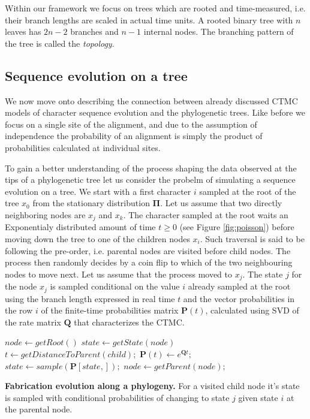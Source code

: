 \documentclass[12pt,twoside]{mitthesis}
\theoremstyle{plain}
\theoremstyle{definition}
\theoremstyle{remark}
\begin{document}
Within our framework we focus on trees which are rooted and time-measured, i.e. their branch lengths are scaled in actual time units.
A rooted binary tree with $n$ leaves has $2n-2$ branches and $n-1$ internal nodes.
The branching pattern of the tree is called the \emph{topology}. 

\subsection{Sequence evolution on a tree\label{sub:evolutionOnTree}}

We now move onto describing the connection between already discussed CTMC models of character sequence evolution and the phylogenetic trees.
Like before we focus on a single site of the alignment, and due to the assumption of independence the probability of an alignment is simply the product of probabilities calculated at individual sites.

To gain a better understanding of the process shaping the data observed at the tips of a phylogenetic tree let us consider the probelm of simulating a sequence evolution on a tree.
We start with a first character $i$ sampled at the root of the tree $x_0$ from the stationary distribution $\mathbf{\Pi}$.
Let us assume that two directly neighboring nodes are $x_j$ and $x_k$.
The character sampled at the root waits an Exponentialy distributed amount of time $t\geq0$ (see Figure \ref{fig:poisson}) before moving down the tree to one of the children nodes $x_i$.
Such traversal is said to be following the pre-order, i.e. parental nodes are visited before child nodes.   
The process then randomly decides by a coin flip to which of the two neighbouring nodes to move next.
Let us assume that the process moved to $x_j$.
The state $j$ for the node $x_j$ is sampled conditional on the value $i$ already sampled at the root using the branch length expressed in real time $t$ and the vector probabilities in the row $i$ of the finite-time probabilities matrix $\mathbf{P}(t)$, calculated using SVD of the rate matrix $\mathbf{Q}$ that characterizes the CTMC.   

\begin{algorithm}
\begin{center}
\begin{algorithmic}[1]
\footnotesize{
%
\State $node \gets getRoot\left(\right)$
%
\State $state \gets getState\left(node\right)$
%
\Repeat
%
%
%
\State $t \gets getDistanceToParent\left(child\right);$
%
\State $ \mathbf{P}\left(t\right) \gets e^{\mathbf{Q}t};$
%
\State $state \gets sample\left(\mathbf{P}\left[ state, \right]\right);$
%
\EndFor
%
\Else {}
%
\State $node \gets getParent\left(node\right);$
%
\EndIf
%
}
\end{algorithmic}
\end{center}
\caption{{ \footnotesize {\bf Fabrication evolution along a phylogeny.} 
For a visited child node it's state is sampled with conditional probabilities of changing to state $j$ given state $i$ at the parental node.
}}
\end{algorithm}
\end{document}
